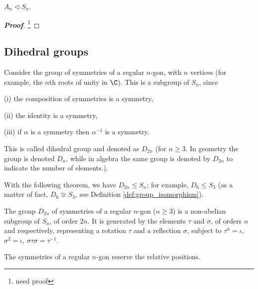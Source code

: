 \begin{proposition}\label{pro:an_sn_normal}
$A_n \lhd S_n$.
\end{proposition}

\begin{proof}[\bf Proof]
\footnote{need proof}
\end{proof}





\subsection{Dihedral groups}

\begin{definition}\label{def:dihedral_group_symmetries}
Consider the group of symmetries of a regular $n$-gon, with $n$ vertices (for example, the $n$th roots of unity in $\C$). This is a subgroup of $S_n$, since
\ben
\item [(i)] the composition of symmetries is a symmetry,
\item [(ii)] the identity is a symmetry,
\item [(iii)] if $\alpha$ is a symmetry then $\alpha^{-1}$ is a symmetry.
\een

This is called dihedral group and denoted as $D_{2n}$ (for $n\geq 3$. In geometry the group is denoted $D_n$, while in algebra the same group is denoted by $D_{2n}$ to indicate the number of elements.).
\end{definition}

With the following theorem, we have $D_{2n}\leq S_n$; for example, $D_6 \leq S_3$ (as a matter of fact, $D_6 \cong S_3$, see Definition \ref{def:group_isomorphism}).

\begin{theorem}\label{thm:dihedral_symmetric_subgroup}
The group $D_{2n}$ of symmetries of a regular $n$-gon ($n\geq 3$) is a non-abelian subgroup of $S_n$, of order $2n$. It is generated by the elements $\tau$ and $\sigma$, of orders $n$ and respectively, representing a rotation $\tau$ and a reflection $\sigma$, subject to $\tau^n = \iota$, $\sigma^2 = \iota$, $\sigma \tau \sigma = \tau^{-1}$.
\end{theorem}

\begin{remark}
The symmetries of a regular $n$-gon reserve the relative positions.
\end{remark}

